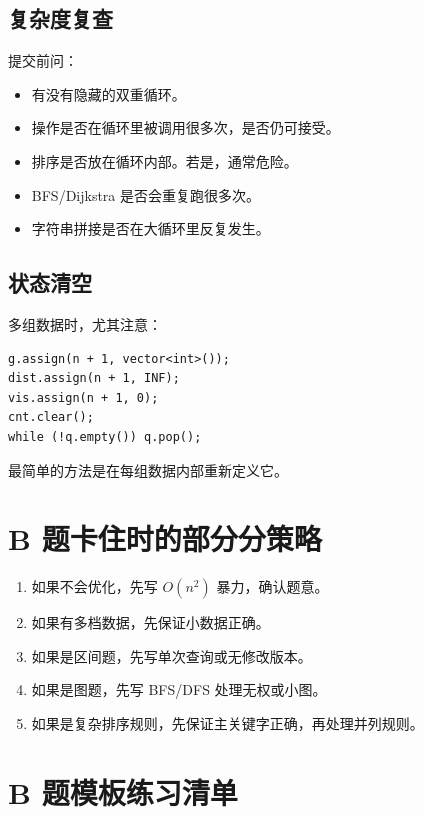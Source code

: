 \subsection{复杂度复查}

提交前问：

\begin{itemize}
  \item 有没有隐藏的双重循环。
  \item {} 操作是否在循环里被调用很多次，是否仍可接受。
  \item 排序是否放在循环内部。若是，通常危险。
  \item BFS/Dijkstra 是否会重复跑很多次。
  \item 字符串拼接是否在大循环里反复发生。
\end{itemize}

\subsection{状态清空}

多组数据时，尤其注意：

\begin{lstlisting}
g.assign(n + 1, vector<int>());
dist.assign(n + 1, INF);
vis.assign(n + 1, 0);
cnt.clear();
while (!q.empty()) q.pop();
\end{lstlisting}

最简单的方法是在每组数据内部重新定义它。

\section{B 题卡住时的部分分策略}\label{sec:06-31}

\begin{enumerate}
  \item 如果不会优化，先写 $O(n^2)$ 暴力，确认题意。
  \item 如果有多档数据，先保证小数据正确。
  \item 如果是区间题，先写单次查询或无修改版本。
  \item 如果是图题，先写 BFS/DFS 处理无权或小图。
  \item 如果是复杂排序规则，先保证主关键字正确，再处理并列规则。
\end{enumerate}

\section{B 题模板练习清单}\label{sec:06-32}

